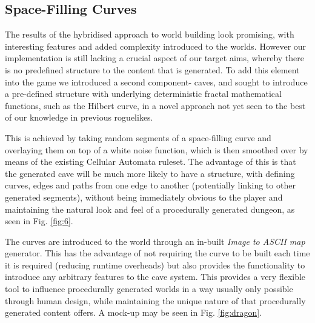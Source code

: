 \documentclass[12pt,a4paper]{article}
\begin{document}
\subsection{Space-Filling Curves}

The results of the hybridised approach to world building look promising, with interesting features and added complexity introduced to the worlds. However our implementation is still lacking a crucial aspect of our target aims, whereby there is no predefined structure to the content that is generated. To add this element into the game we introduced a second component- caves, and sought to introduce a pre-defined structure with underlying deterministic fractal mathematical functions, such as the Hilbert curve, in a novel approach not yet seen to the best of our knowledge in previous roguelikes. 

This is achieved by taking random segments of a space-filling curve and overlaying them on top of a white noise function, which is then smoothed over by means of the existing Cellular Automata ruleset. The advantage of this is that the generated cave will be much more likely to have a structure, with defining curves, edges and paths from one edge to another (potentially linking to other generated segments), without being immediately obvious to the player and maintaining the natural look and feel of a procedurally generated dungeon, as seen in Fig. \ref{fig:6}. 

The curves are introduced to the world through an in-built \emph{Image to ASCII map} generator. This has the advantage of not requiring the curve to be built each time it is required (reducing runtime overheads) but also provides the functionality to introduce any arbitrary features to the cave system. This provides a very flexible tool to influence procedurally generated worlds in a way usually only possible through human design, while maintaining the unique nature of that procedurally generated content offers. A mock-up may be seen in Fig. \ref{fig:dragon}.

\end{document}
